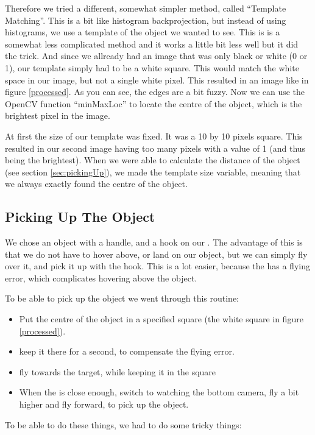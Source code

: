 Therefore we tried a different, somewhat simpler method, called ``Template Matching''. This is a bit like histogram backprojection, but instead of using histograms, we 
use a template of the object we wanted to see. This is is a somewhat less complicated method and it works a little bit less well but it did the trick. And 
since we allready had an image that was only black or white (0 or 1), our template simply had to be a white square. This would match the white space in our image, but not a
 single white pixel. This resulted in an image like in figure \ref{processed}. As you can see, the edges are a bit fuzzy. Now we can use the OpenCV function ``minMaxLoc'' 
to locate the centre of the object, which is the brightest pixel in the image. 

At first the size of our template was fixed. It was a 10 by 10 pixels square. This resulted in our second image having too many pixels with a value of 1 (and thus being the brightest). When we were able to calculate the distance of the object (see section \ref{sec:pickingUp}), we made the template size variable, meaning that we always exactly found the centre of the object. 

\subsection{Picking Up The Object}
We chose an object with a handle, and a hook on our \Ardrone. The advantage of this is that we do not have to hover above, or land on our object, but we can simply fly over it, and pick it up with the hook. This is a lot easier, because the \Ardrone has a flying error, which complicates hovering above the object. 

To be able to pick up the object we went through this routine:
\begin{itemize}
\item Put the centre of the object in a specified square (the white square in figure \ref{processed}). 
\item keep it there for a second, to compensate the flying error.
\item fly towards the target, while keeping it in the square
\item When the \Ardrone is close enough, switch to watching the bottom camera, fly a bit higher and fly forward, to pick up the object.
\end{itemize}
To be able to do these things, we had to do some tricky things:


